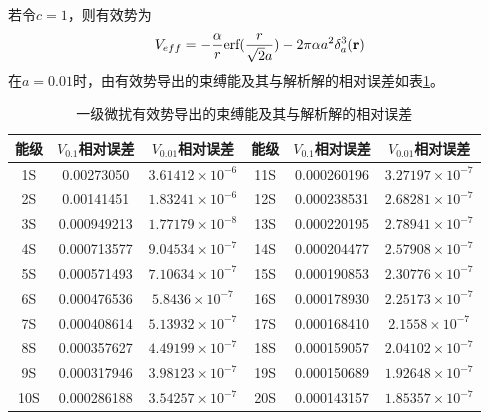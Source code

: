 \documentclass[cs4size,titlepage,twoside]{ctexart}
\begin{document}
若令$c=1$，则有效势为
\begin{equation}
	V_{eff}=-\frac{\alpha}{r}\text{erf}(\frac{r}{\sqrt{2}a})-2\pi\alpha a^2\delta_a^3(\vb{r})
\end{equation}
在$a=0.01$时，由有效势导出的束缚能及其与解析解的相对误差如表\ref{pertu1}。
\begin{table}[!htbp]
	\centering
	\begin{tabular}{|cccccc|}
		\hline
		能级 & $V_{0.1}$相对误差 & $V_{0.01}$相对误差 & 能级 & $V_{0.1}$相对误差 & $V_{0.01}$相对误差 \\\hline
		1S     & 0.00273050            & $3.61412\times10^{-6}$ & 11S    & 0.000260196           & $3.27197\times10^{-7}$ \\
		2S     & 0.00141451            & $1.83241\times10^{-6}$ & 12S    & 0.000238531           & $2.68281\times10^{-7}$ \\
		3S     & 0.000949213           & $1.77179\times10^{-8}$ & 13S    & 0.000220195           & $2.78941\times10^{-7}$ \\
		4S     & 0.000713577           & $9.04534\times10^{-7}$ & 14S    & 0.000204477           & $2.57908\times10^{-7}$ \\
		5S     & 0.000571493           & $7.10634\times10^{-7}$ & 15S    & 0.000190853           & $2.30776\times10^{-7}$ \\
		6S     & 0.000476536           & $5.8436\times10^{-7}$  & 16S    & 0.000178930           & $2.25173\times10^{-7}$ \\
		7S     & 0.000408614           & $5.13932\times10^{-7}$ & 17S    & 0.000168410           & $2.1558\times10^{-7}$  \\
		8S     & 0.000357627           & $4.49199\times10^{-7}$ & 18S    & 0.000159057           & $2.04102\times10^{-7}$ \\
		9S     & 0.000317946           & $3.98123\times10^{-7}$ & 19S    & 0.000150689           & $1.92648\times10^{-7}$ \\
		10S    & 0.000286188           & $3.54257\times10^{-7}$ & 20S    & 0.000143157           & $1.85357\times10^{-7}$ \\
		\hline
	\end{tabular}
	\caption{一级微扰有效势导出的束缚能及其与解析解的相对误差}\label{pertu1}
\end{table}
\end{document}
